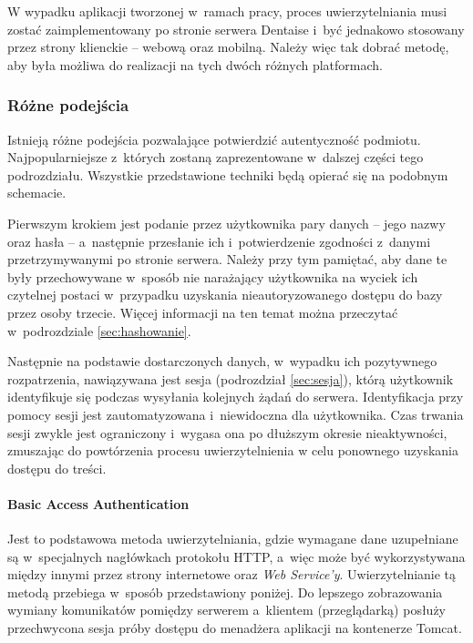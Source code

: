 \documentclass[11pt]{aghdpl}
\begin{document}
W wypadku aplikacji tworzonej w~ramach pracy, proces uwierzytelniania musi zostać zaimplementowany po stronie serwera Dentaise i~być jednakowo stosowany przez strony klienckie -- webową oraz mobilną. Należy więc tak dobrać metodę, aby była możliwa do realizacji na tych dwóch różnych platformach.

\subsubsection{Różne podejścia}

Istnieją różne podejścia pozwalające potwierdzić autentyczność podmiotu. Najpopularniejsze z~których zostaną zaprezentowane w~dalszej części tego podrozdziału. Wszystkie przedstawione techniki będą opierać się na podobnym schemacie. 

Pierwszym krokiem jest podanie przez użytkownika pary danych -- jego nazwy oraz hasła -- a~następnie przesłanie ich i~potwierdzenie zgodności z~danymi przetrzymywanymi po stronie serwera. Należy przy tym pamiętać, aby dane te były przechowywane w~sposób nie narażający użytkownika na wyciek ich czytelnej postaci w~przypadku uzyskania nieautoryzowanego dostępu do bazy przez osoby trzecie. Więcej informacji na ten temat można przeczytać w~podrozdziale \ref{sec:hashowanie}. 

Następnie na podstawie dostarczonych danych, w~wypadku ich pozytywnego rozpatrzenia, nawiązywana jest sesja (podrozdział \ref{sec:sesja}), którą użytkownik identyfikuje się podczas wysyłania kolejnych żądań do serwera. Identyfikacja przy pomocy sesji jest zautomatyzowana i~niewidoczna dla użytkownika. Czas trwania sesji zwykle jest ograniczony i~wygasa ona po dłuższym okresie nieaktywności, zmuszając do powtórzenia procesu uwierzytelnienia w celu ponownego uzyskania dostępu do treści.

\paragraph{Basic Access Authentication}

Jest to podstawowa metoda uwierzytelniania, gdzie wymagane dane uzupełniane są w~specjalnych nagłówkach protokołu HTTP, a~więc może być wykorzystywana między innymi przez strony internetowe oraz \emph{Web Service'y}. Uwierzytelnianie tą metodą przebiega w~sposób przedstawiony poniżej. Do lepszego zobrazowania wymiany komunikatów pomiędzy serwerem a~klientem (przeglądarką) posłuży przechwycona sesja próby dostępu do menadżera aplikacji na kontenerze Tomcat.
\end{document}
